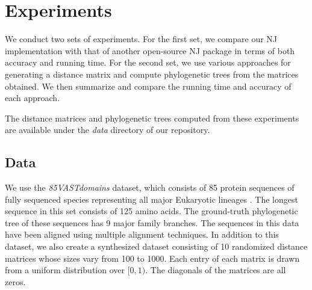 \documentclass[11pt,letterpaper]{article}
\theoremstyle{definition}
\begin{document}
\section{Experiments}

We conduct two sets of experiments. For the first set, we compare our NJ implementation with that of another open-source NJ package in terms of both accuracy and running time. For the second set, we use various approaches for generating a distance matrix and compute phylogenetic trees from the matrices obtained. We then summarize and compare the running time and accuracy of each approach. 




The distance matrices and phylogenetic trees computed from these experiments are available under the \textit{data} directory of our repository. 

\subsection{Data}
\label{data}

We use the \textit{85VASTdomains} dataset, which consists of 85 protein sequences of fully sequenced species representing all major Eukaryotic lineages \cite{khafif2014identification}. The longest sequence in this set consists of 125 amino acids. The ground-truth phylogenetic tree of these sequences has 9 major family branches. The sequences in this data have been aligned using multiple alignment techniques. In addition to this dataset, we also create a synthesized dataset consisting of 10 randomized distance matrices whose sizes vary from 100 to 1000. Each entry of each matrix is drawn from a uniform distribution over $[0, 1)$. The diagonals of the matrices are all zeros.   
\end{document}

